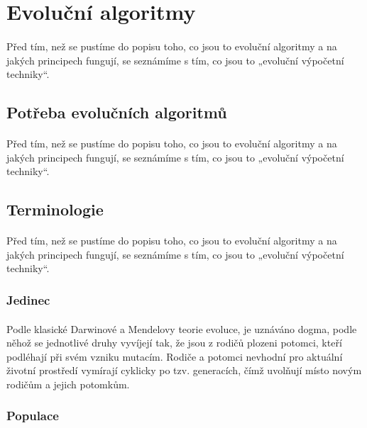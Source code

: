 \documentclass[bc,male,java,dept460]{diploma}		%
\begin{document}
\section{Evoluční algoritmy}
\paragraph*{}
Před tím, než se pustíme do popisu toho, co jsou to evoluční algoritmy a na jakých principech fungují, se seznámíme s tím, co jsou to „evoluční výpočetní techniky“.

\subsection{Potřeba evolučních algoritmů}
\paragraph*{}
Před tím, než se pustíme do popisu toho, co jsou to evoluční algoritmy a na jakých principech fungují, se seznámíme s tím, co jsou to „evoluční výpočetní techniky“.

\subsection{Terminologie}
\paragraph*{}
Před tím, než se pustíme do popisu toho, co jsou to evoluční algoritmy a na jakých principech fungují, se seznámíme s tím, co jsou to „evoluční výpočetní techniky“.

\subsubsection{Jedinec}
\paragraph*{}
Podle klasické Darwinové a Mendelovy teorie evoluce, je uznáváno dogma, podle něhož se jednotlivé druhy vyvíjejí tak, že jsou z rodičů plozeni potomci, kteří podléhají při svém vzniku mutacím. Rodiče a potomci nevhodní pro aktuální životní prostředí vymírají cyklicky po tzv. generacích, čímž uvolňují místo novým rodičům a jejich potomkům.

\subsubsection{Populace}
\end{document}
